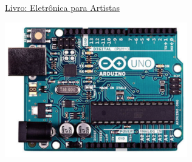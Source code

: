 
{\Large 
	\href{http://eletronicaparaartistas.com.br/arduino-1-introducao}{Livro: Eletrônica para Artistas}

}

\begin{center}
	\includegraphics[width=.7\linewidth]{./IMG/Arduino-Uno.png}
\end{center}


\vfill\null
\columnbreak
